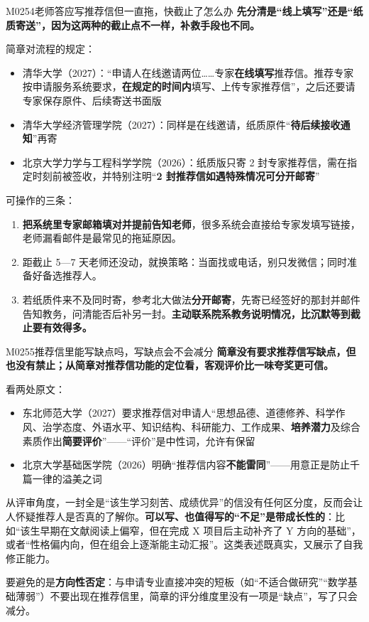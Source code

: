 \begin{qa}{M0254}{老师答应写推荐信但一直拖，快截止了怎么办}
\textbf{先分清是“线上填写”还是“纸质寄送”，因为这两种的截止点不一样，补救手段也不同。}

简章对流程的规定：

\begin{itemize}
  \item 清华大学（2027）：“申请人在线邀请两位……专家\textbf{在线填写}推荐信。推荐专家按申请服务系统要求，\textbf{在规定的时间内}填写、上传专家推荐信”，之后还要请专家保存原件、后续寄送书面版
  \item 清华大学经济管理学院（2027）：同样是在线邀请，纸质原件“\textbf{待后续接收通知}”再寄
  \item 北京大学力学与工程科学学院（2026）：纸质版只寄 2 封专家推荐信，需在指定时刻前被签收，并特别注明“\textbf{2 封推荐信如遇特殊情况可分开邮寄}”
\end{itemize}

可操作的三条：

\begin{enumerate}
  \item \textbf{把系统里专家邮箱填对并提前告知老师}，很多系统会直接给专家发填写链接，老师漏看邮件是最常见的拖延原因。
  \item 距截止 5—7 天老师还没动，就换策略：当面找或电话，别只发微信；同时准备好备选推荐人。
  \item 若纸质件来不及同时寄，参考北大做法\textbf{分开邮寄}，先寄已经签好的那封并邮件告知教务，问清能否后补另一封。\textbf{主动联系院系教务说明情况，比沉默等到截止要有效得多。}
\end{enumerate}
\end{qa}

\begin{qa}{M0255}{推荐信里能写缺点吗，写缺点会不会减分}
\textbf{简章没有要求推荐信写缺点，但也没有禁止；从简章对推荐信功能的定位看，客观评价比一味夸奖更可信。}

看两处原文：

\begin{itemize}
  \item 东北师范大学（2027）要求推荐信对申请人“思想品德、道德修养、科学作风、治学态度、外语水平、知识结构、科研能力、工作成果、\textbf{培养潜力}及综合素质作出\textbf{简要评价}”——“评价”是中性词，允许有保留
  \item 北京大学基础医学院（2026）明确“推荐信内容\textbf{不能雷同}”——用意正是防止千篇一律的溢美之词
\end{itemize}

从评审角度，一封全是“该生学习刻苦、成绩优异”的信没有任何区分度，反而会让人怀疑推荐人是否真的了解你。\textbf{可以写、也值得写的“不足”是带成长性的}：比如“该生早期在文献阅读上偏窄，但在完成 X 项目后主动补齐了 Y 方向的基础”，或者“性格偏内向，但在组会上逐渐能主动汇报”。这类表述既真实，又展示了自我修正能力。

要避免的是\textbf{方向性否定}：与申请专业直接冲突的短板（如“不适合做研究”“数学基础薄弱”）不要出现在推荐信里，简章的评分维度里没有一项是“缺点”，写了只会减分。
\end{qa}

